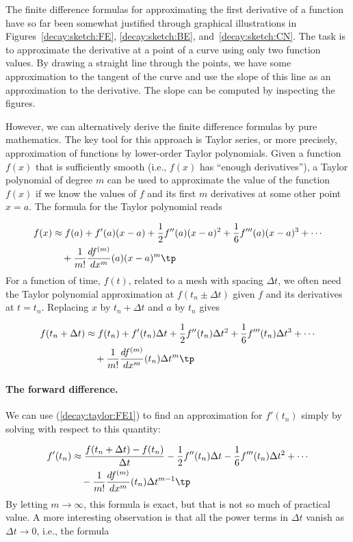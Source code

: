 \documentclass[graybox,sectrefs,envcountresetchap,open=right,final]{svmonodo}
\begin{document}
The finite difference formulas for approximating the first derivative
of a function have so far been somewhat justified through graphical
illustrations in Figures~\ref{decay:sketch:FE}, \ref{decay:sketch:BE},
and~\ref{decay:sketch:CN}. The task is to approximate the derivative
at a point of a curve using only two function values. By drawing
a straight line through the points, we have some approximation to
the tangent of the curve and use the slope of this line as
an approximation to the derivative. The slope can be computed by
inspecting the figures.

However, we can alternatively derive the finite difference formulas by
pure mathematics. The key tool for this approach is Taylor series,
or more precisely, approximation of functions by lower-order
Taylor polynomials. Given a function $f(x)$ that is sufficiently
smooth (i.e., $f(x)$ has ``enough derivatives''),
a Taylor polynomial of degree $m$ can be used to approximate the
value of the function $f(x)$ if we know the values of $f$ and its
first $m$ derivatives at some other point $x=a$. The formula for the
Taylor polynomial reads

\begin{align}
f(x) & \approx f(a) + f'(a)(x-a) + \frac{1}{2}f''(a)(x-a)^2 +
\frac{1}{6}f'''(a)(x-a)^3 + \cdots \nonumber\\ 
 &\quad + \frac{1}{m!}\frac{df^{(m)}}{dx^m}(a)(x-a)^m\tp
\end{align}
For a function of time, $f(t)$, related to a mesh with spacing $\Delta t$,
we often need the Taylor polynomial approximation at $f(t_n\pm\Delta t)$
given $f$ and its derivatives at $t=t_n$. Replacing $x$ by $t_n+\Delta t$ and
$a$ by $t_n$ gives

\begin{align}
f(t_n+\Delta t) & \approx f(t_n) + f'(t_n)\Delta t + \frac{1}{2}f''(t_n)
\Delta t^2 +
\frac{1}{6}f'''(t_n)\Delta t^3 + \cdots\nonumber\\ 
&\quad + \frac{1}{m!}\frac{df^{(m)}}{dx^m}(t_n)\Delta t^m\tp
\label{decay:taylor:FE1}
\end{align}

\paragraph{The forward difference.}
We can use (\ref{decay:taylor:FE1}) to find an approximation for
$f'(t_n)$ simply by solving with respect to this quantity:

\begin{align}
f'(t_n) & \approx  \frac{f(t_n+\Delta t) - f(t_n)}{\Delta t}
- \frac{1}{2}f''(t_n)\Delta t -
\frac{1}{6}f'''(t_n)\Delta t^2 + \cdots\nonumber\\ 
&\quad - \frac{1}{m!}\frac{df^{(m)}}{dx^m}(t_n)\Delta t^{m-1}\tp
\label{decay:taylor:FE2}
\end{align}
By letting $m\rightarrow\infty$, this formula is exact, but that is not
so much of practical value. A more interesting observation is that
all the power terms in $\Delta t$ vanish as $\Delta t\rightarrow 0$, i.e.,
the formula
\end{document}
